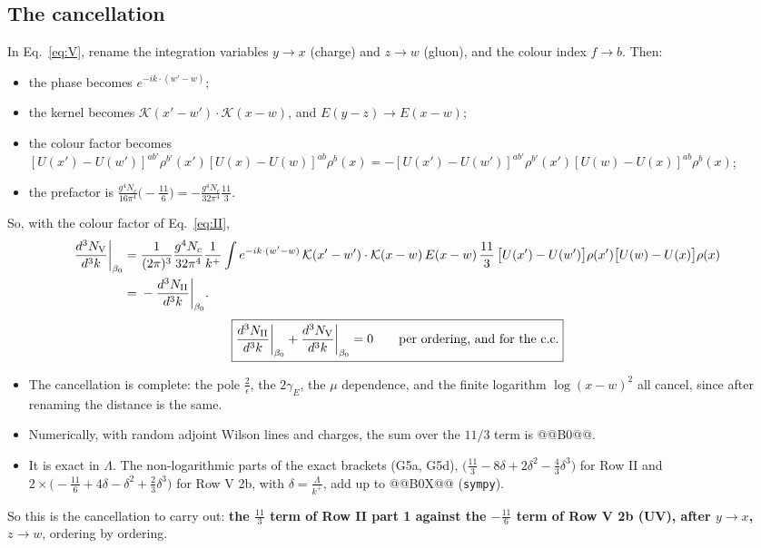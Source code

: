 \documentclass[10pt]{article}
\numberwithin{equation}{section}
\begin{document}
\subsection{The cancellation}
In Eq.~\eqref{eq:V}, rename the integration variables $y\to x$ (charge) and $z\to w$ (gluon), and the colour index $f\to b$. Then:
\begin{itemize}
\item the phase becomes $e^{-ik\cdot(w'-w)}$;
\item the kernel becomes $\mathcal K(x'-w')\cdot\mathcal K(x-w)$, and $E(y-z)\to E(x-w)$;
\item the colour factor becomes $[U(x')-U(w')]^{ab'}\rho^{b'}(x')[U(x)-U(w)]^{ab}\rho^b(x)=-[U(x')-U(w')]^{ab'}\rho^{b'}(x')[U(w)-U(x)]^{ab}\rho^b(x)$;
\item the prefactor is $\frac{g^4N_c}{16\pi^4}\big(-\frac{11}{6}\big)=-\frac{g^4N_c}{32\pi^4}\frac{11}{3}$.
\end{itemize}
So, with the colour factor of Eq.~\eqref{eq:II},
\begin{align}
\frac{d^3N_{\rm V}}{d^3k}\bigg|_{\beta_0}={}&\frac{1}{(2\pi)^3}\frac{g^4N_c}{32\pi^4}\frac{1}{k^+}\int e^{-ik\cdot(w'-w)}\,\mathcal K(x'-w')\cdot\mathcal K(x-w)\,E(x-w)\,\frac{11}{3}\,\big[U(x')-U(w')\big]\rho(x')\big[U(w)-U(x)\big]\rho(x)\notag\\
={}&-\frac{d^3N_{\rm II}}{d^3k}\bigg|_{\beta_0}.
\end{align}
\begin{equation}
\boxed{\frac{d^3N_{\rm II}}{d^3k}\bigg|_{\beta_0}+\frac{d^3N_{\rm V}}{d^3k}\bigg|_{\beta_0}=0\qquad\text{per ordering, and for the c.c.}}
\end{equation}
\begin{itemize}
\item The cancellation is complete: the pole $\frac2\epsilon$, the $2\gamma_E$, the $\mu$ dependence, and the finite logarithm $\log(x-w)^2$ all cancel, since after renaming the distance is the same.
\item Numerically, with random adjoint Wilson lines and charges, the sum over the $11/3$ term is @@B0@@.
\item It is exact in $\Lambda$. The non-logarithmic parts of the exact brackets (G5a, G5d), $\big(\frac{11}{3}-8\delta+2\delta^2-\frac43\delta^3\big)$ for Row II and $2\times\big(-\frac{11}{6}+4\delta-\delta^2+\frac23\delta^3\big)$ for Row V 2b, with $\delta=\frac{\Lambda}{k^+}$, add up to @@B0X@@ (\texttt{sympy}).
\end{itemize}
So this is the cancellation to carry out: \textbf{the $\frac{11}{3}$ term of Row II part 1 against the $-\frac{11}{6}$ term of Row V 2b (UV), after $y\to x$, $z\to w$}, ordering by ordering.
\end{document}
